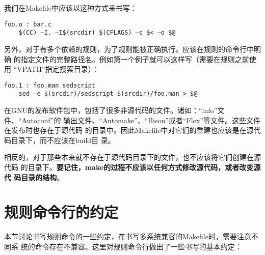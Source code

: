 \begin{enumerate}
我们在Makefile中应该以这种方式来书写：

\begin{Verbatim}[]
foo.o : bar.c
    $(CC) –I. –I$(srcdir) $(CFLAGS) –c $< –o $@
\end{Verbatim}

另外，对于有多个依赖的规则，为了规则能被正确执行。应该在规则的命令行中明确
的指定文件的完整路径名。例如第一个例子就可以这样写（需要在规则之前使用
“VPATH”指定搜索目录）：

\begin{Verbatim}[]
foo.1 : foo.man sedscript
    sed –e $(srcdir)/sedscript $(srcdir)/foo.man > $@
\end{Verbatim}

\end{enumerate}

在GNU的发布软件包中，包括了很多非源代码的文件。诸如：“info”文件、“Autoconf”的
输出文件、“Automake”、“Bison”或者“Flex”等文件。这些文件在发布时也存在于源代码
的目录中。因此Makefile中对它们的重建也应该是在源代码目录下，而不应该在build目
录。

相反的，对于那些本来就不存在于源代码目录下的文件，也不应该将它们创建在源代码
的目录下。\textbf{要记住，make的过程不应该以任何方式修改源代码，或者改变源代
码目录的结构}。

\section{规则命令行的约定}
本节讨论书写规则命令的一些约定，在书写多系统兼容的Makefile时，需要注意不同系
统的命令存在不兼容。这里对规则命令行做出了一些书写的基本约定：

